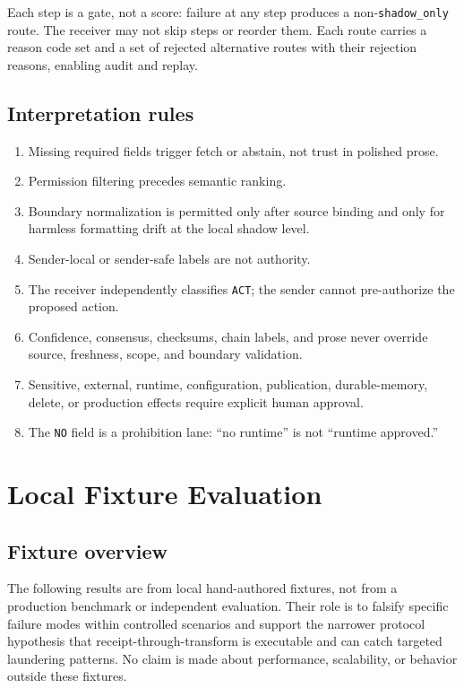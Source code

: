 \documentclass[11pt]{article}
\begin{document}
Each step is a gate, not a score: failure at any step produces a
non-\texttt{shadow\_only} route. The receiver may not skip steps or reorder them.
Each route carries a reason code set and a set of rejected alternative routes with
their rejection reasons, enabling audit and replay.

\subsection{Interpretation rules}

\begin{enumerate}
  \item Missing required fields trigger fetch or abstain, not trust in polished prose.
  \item Permission filtering precedes semantic ranking.
  \item Boundary normalization is permitted only after source binding and only for
        harmless formatting drift at the local shadow level.
  \item Sender-local or sender-safe labels are not authority.
  \item The receiver independently classifies \texttt{ACT}; the sender cannot
        pre-authorize the proposed action.
  \item Confidence, consensus, checksums, chain labels, and prose never override
        source, freshness, scope, and boundary validation.
  \item Sensitive, external, runtime, configuration, publication, durable-memory,
        delete, or production effects require explicit human approval.
  \item The \texttt{NO} field is a prohibition lane: ``no runtime'' is not
        ``runtime approved.''
\end{enumerate}

\section{Local Fixture Evaluation}
\label{sec:evidence}

\subsection{Fixture overview}

The following results are from local hand-authored fixtures, not from a production
benchmark or independent evaluation. Their role is to falsify specific failure modes
within controlled scenarios and support the narrower protocol hypothesis that
receipt-through-transform is executable and can catch targeted laundering patterns.
No claim is made about performance, scalability, or behavior outside these fixtures.
\end{document}

